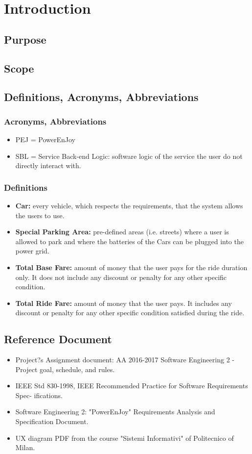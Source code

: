 \section{Introduction}
\subsection{Purpose}


\subsection{Scope}


\subsection{Definitions, Acronyms, Abbreviations}
\subsubsection{Acronyms, Abbreviations}
\begin{itemize}
    \item PEJ = PowerEnJoy
    \item SBL = Service Back-end Logic: software logic of the service the user do not directly interact with.
\end{itemize}
\subsubsection{Definitions}
\begin{itemize}
\item \textbf{Car:} every vehicle, which respects the requirements, that the system allows the users to use.
    \item \textbf{Special Parking Area:} pre-defined areas (i.e. streets) where a user is allowed to park and where the batteries of the Cars can be plugged into the power grid.
    \item \textbf{Total Base Fare:} amount of money that the user pays for the ride duration only. It does not include any discount or penalty for any other specific condition.
    \item \textbf{Total Ride Fare:} amount of money that the user pays. It includes any discount or penalty for any other specific condition satisfied during the ride.
\end{itemize}

\subsection{Reference Document}
\begin{itemize}
    \item Project?s Assignment document: AA 2016-2017 Software Engineering 2 - Project goal, schedule, and rules.
    \item IEEE Std 830-1998, IEEE Recommended Practice for Software Requirements Spec- ifications.
    \item Software Engineering 2: "PowerEnJoy" Requirements Analysis and Specification Document.
    \item UX diagram PDF from the course "Sistemi Informativi" of Politecnico of Milan.
\end{itemize}


